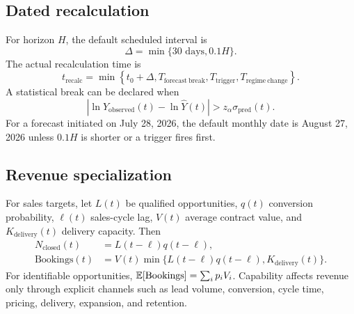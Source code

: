 \subsection{Dated recalculation}

For horizon $H$, the default scheduled interval is
\begin{equation}
\Delta=\min\{30\text{ days},0.1H\}.
\end{equation}
The actual recalculation time is
\begin{equation}
\label{eq:recalc}
t_{\mathrm{recalc}}=\min\left\{t_0+\Delta,T_{\mathrm{forecast\ break}},T_{\mathrm{trigger}},T_{\mathrm{regime\ change}}\right\}.
\end{equation}
A statistical break can be declared when
\begin{equation}
\left|\ln Y_{\mathrm{observed}}(t)-\ln\widehat Y(t)\right|>z_\alpha\sigma_{\mathrm{pred}}(t).
\end{equation}
For a forecast initiated on July 28, 2026, the default monthly date is August 27, 2026 unless $0.1H$ is shorter or a trigger fires first.

\subsection{Revenue specialization}

For sales targets, let $L(t)$ be qualified opportunities, $q(t)$ conversion probability, $\ell(t)$ sales-cycle lag, $V(t)$ average contract value, and $K_{\mathrm{delivery}}(t)$ delivery capacity. Then
\begin{align}
N_{\mathrm{closed}}(t)&=L(t-\ell)q(t-\ell),\\
\mathrm{Bookings}(t)&=V(t)\min\{L(t-\ell)q(t-\ell),K_{\mathrm{delivery}}(t)\}.
\end{align}
For identifiable opportunities, $\mathbb{E}[\mathrm{Bookings}]=\sum_i p_iV_i$. Capability affects revenue only through explicit channels such as lead volume, conversion, cycle time, pricing, delivery, expansion, and retention.
